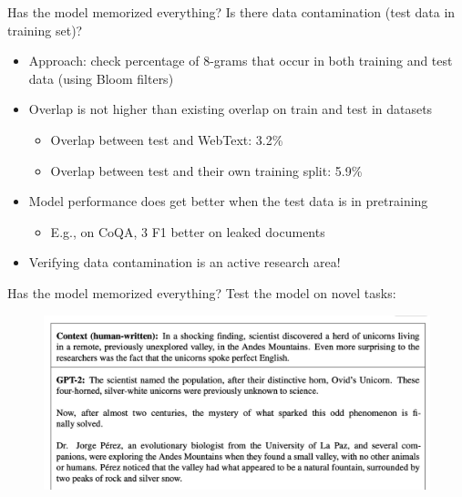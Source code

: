 \documentclass[usenames,dvipsnames,notes,11pt,aspectratio=169,hyperref={colorlinks=true, linkcolor=blue}]{beamer}
\begin{document}
\begin{frame}
    {Has the model memorized everything?}
    Is there data contamination (test data in training set)?
    \begin{itemize}[<+->]
        \item Approach: check percentage of 8-grams that occur in both training and test data (using Bloom filters)
        \item Overlap is not higher than existing overlap on train and test in datasets
        \begin{itemize}
            \item Overlap between test and WebText: 3.2\%
            \item Overlap between test and their own training split: 5.9\%
        \end{itemize}
        \item Model performance does get better when the test data is in pretraining
        \begin{itemize}
            \item E.g., on CoQA, 3 F1 better on leaked documents 
        \end{itemize}
        \item Verifying data contamination is an active research area!
    \end{itemize}
\end{frame}

\begin{frame}
    {Has the model memorized everything?}
    Test the model on novel tasks:\\[-1em]
    \begin{figure}
        \includegraphics[width=\textwidth]{figures/gpt2-gen}
    \end{figure}
\end{frame}
\end{document}
